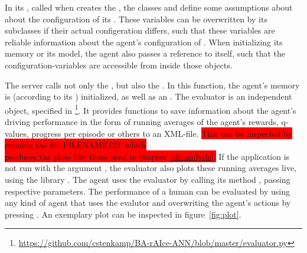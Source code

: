 In its , called when  creates the , the classes  and  define some assumptions about about the configuration of its . These variables can be overwritten by its subclasses if their actual configeration differs, such that these variables are reliable information about the agent's configuration of . When initializing its memory or its model, the agent also passes a reference to itself, such that the configuration-variables are accessible from inside those objects. 

The server calls not only the , but also the . In this function, the agent's memory is (according to its ) initialized, as well as an . The evaluator is an independent object, specified in \footnote{\url{https://github.com/cstenkamp/BA-rAIce-ANN/blob/master/evaluator.py}}. It provides functions to save information about the agent's driving performance in the form of running averages of the agent's rewards, q-values, progress per episode or others to an XML-file. \colorbox{red}{This can be inspected by running the file FILENAME123, which \\ produces the plots like those used in chapter~\ref{ch:analysis}.} If the application is not run with the argument , the evaluator also plots these running averages live, using the library . The agent uses the evaluator by calling its method , passing respective parameters. The performance of a human can be evaluated by using any kind of agent that uses the evalutor and overwriting the agent's actions by pressing . An exemplary plot can be inspected in figure~\ref{fig:plot}.

